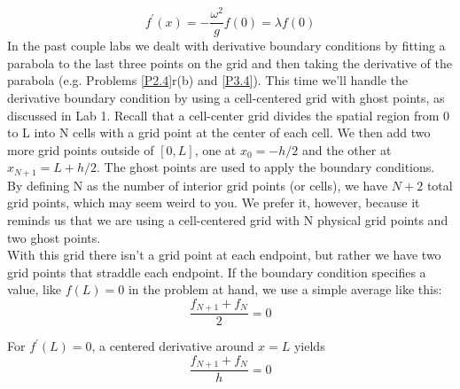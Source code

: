 	\begin{equation}\label{eq:45}
		f^\prime(x) = - \frac{\omega^2}{g}f(0) = \lambda f(0)
				\end{equation}		
				In the past couple labs we dealt with derivative boundary conditions by fitting
a parabola to the last three points on the grid and then taking the derivative of
the parabola (e.g. Problems \ref{P2.4}r(b) and \ref{P3.4}). This time we\rq ll handle the derivative
boundary condition by using a cell-centered grid with ghost points, as discussed
in Lab 1. Recall that a cell-center grid divides the spatial region from 0 to L into
N cells with a grid point at the center of each cell. We then add two more grid
points outside of $[0,L]$, one at $x_0  = −h/2$ and the other at $x_{N+1} = L + h/2$. The
ghost points are used to apply the boundary conditions. By defining N as the
number of interior grid points (or cells), we have $N +2$ total grid points, which
may seem weird to you. We prefer it, however, because it reminds us that we are
using a cell-centered grid with N physical grid points and two ghost points. \\
With this grid there isn\rq t a grid point at each endpoint, but rather we have two
grid points that straddle each endpoint. If the boundary condition specifies a
value, like $f (L) = 0 $ in the problem at hand, we use a simple average like this:
\begin{equation}\label{eq:46}
		\frac{f_{N+1} + f_N}{2}=0
				\end{equation}	

For $f^\prime (L) = 0$, a centered derivative around $x = L$ yields
\begin{equation}\label{eq:47}
		\frac{f_{N+1} + f_N}{h}=0
				\end{equation}	
			

